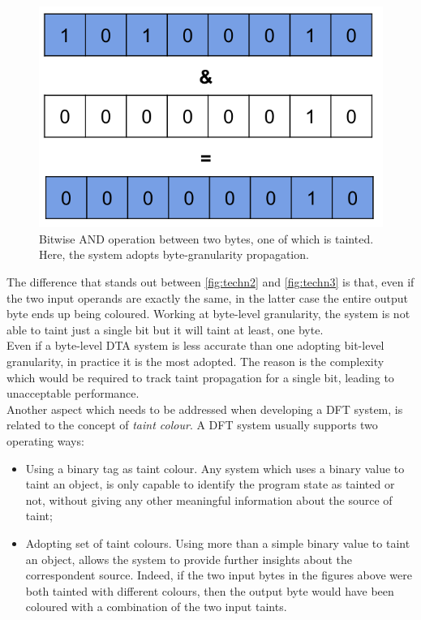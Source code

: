 \documentclass[LaM,binding=0.6cm]{sapthesis}
\begin{document}
\begin{figure}[h!]
\centering
\includegraphics[scale=.5]{images/techn3}
\caption{Bitwise AND operation between two bytes, one of which is tainted. Here, the system adopts byte-granularity propagation.}
\label{fig:techn3}
\end{figure}
\newpage
The difference that stands out between \autoref{fig:techn2} and \autoref{fig:techn3} is that, even if the two input operands are exactly the same, in the latter case the entire output byte ends up being coloured. Working at byte-level granularity, the system is not able to taint just a single bit but it will taint at least, one byte.\\
Even if a byte-level DTA system is less accurate than one adopting bit-level granularity, in practice it is the most adopted. The reason is the complexity which would be required to track taint propagation for a single bit, leading to unacceptable performance.\\

Another aspect which needs to be addressed when developing a DFT system, is related to the concept of \textit{taint colour}. A DFT system usually supports two operating ways:
\begin{itemize}
\item Using a binary tag as taint colour. Any system which uses a binary value to taint an object, is only capable to identify the program state as tainted or not, without giving any other meaningful information about the source of taint; 
\item Adopting set of taint colours. Using more than a simple binary value to taint an object, allows the system to provide further insights about the correspondent source. Indeed, if the two input bytes in the figures above were both tainted with different colours, then the output byte would have been coloured with a combination of the two input taints.
\end{itemize}
\end{document}
